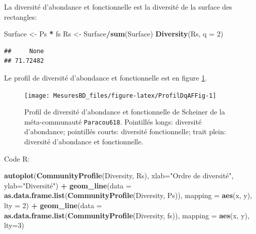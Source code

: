 \documentclass[
  11pt,
  french,
  a4paper,
  extrafontsizes,onecolumn,openright
  ]{memoir}
\newenvironment{Shaded}{\begin{snugshade}}{\end{snugshade}}
\newcommand{\DataTypeTok}[1]{\textcolor[rgb]{0.13,0.29,0.53}{#1}}
\newcommand{\DecValTok}[1]{\textcolor[rgb]{0.00,0.00,0.81}{#1}}
\newcommand{\KeywordTok}[1]{\textcolor[rgb]{0.13,0.29,0.53}{\textbf{#1}}}
\newcommand{\NormalTok}[1]{#1}
\newcommand{\OperatorTok}[1]{\textcolor[rgb]{0.81,0.36,0.00}{\textbf{#1}}}
\newcommand{\StringTok}[1]{\textcolor[rgb]{0.31,0.60,0.02}{#1}}
\begin{document}
\normalsize

La diversité d'abondance et fonctionnelle est la diversité de la surface des rectangles:

\scriptsize

\begin{Shaded}
\begin{Highlighting}[]
\NormalTok{Surface <-}\StringTok{ }\NormalTok{Ps }\OperatorTok{*}\StringTok{ }\NormalTok{fs}
\NormalTok{Rs <-}\StringTok{ }\NormalTok{Surface}\OperatorTok{/}\KeywordTok{sum}\NormalTok{(Surface)}
\KeywordTok{Diversity}\NormalTok{(Rs, }\DataTypeTok{q =} \DecValTok{2}\NormalTok{)}
\end{Highlighting}
\end{Shaded}

\begin{verbatim}
##     None 
## 71.72482
\end{verbatim}

\normalsize

Le profil de diversité d'abondance et fonctionnelle est en figure \ref{fig:ProfilDqAFFig}.



\scriptsize

\begin{figure}

{\centering \texttt{[image: MesuresBD\_files/figure-latex/ProfilDqAFFig-1]} 

}

\caption{Profil de diversité d'abondance et fonctionnelle de Scheiner de la méta-communauté \texttt{Paracou618}. Pointillés longs: diversité d'abondance; pointillés courts: diversité fonctionnelle; trait plein: diversité d'abondance et fonctionnelle.}\label{fig:ProfilDqAFFig}
\end{figure}

\normalsize

Code R:

\scriptsize

\begin{Shaded}
\begin{Highlighting}[]
\KeywordTok{autoplot}\NormalTok{(}\KeywordTok{CommunityProfile}\NormalTok{(Diversity, Rs), }
         \DataTypeTok{xlab=}\StringTok{"Ordre de diversité"}\NormalTok{, }\DataTypeTok{ylab=}\StringTok{"Diversité"}\NormalTok{) }\OperatorTok{+}
\KeywordTok{geom_line}\NormalTok{(}\DataTypeTok{data =} \KeywordTok{as.data.frame.list}\NormalTok{(}\KeywordTok{CommunityProfile}\NormalTok{(Diversity, Ps)), }
          \DataTypeTok{mapping =} \KeywordTok{aes}\NormalTok{(x, y), }\DataTypeTok{lty =} \DecValTok{2}\NormalTok{) }\OperatorTok{+}
\KeywordTok{geom_line}\NormalTok{(}\DataTypeTok{data =} \KeywordTok{as.data.frame.list}\NormalTok{(}\KeywordTok{CommunityProfile}\NormalTok{(Diversity, fs)),}
          \DataTypeTok{mapping =} \KeywordTok{aes}\NormalTok{(x, y), }\DataTypeTok{lty=}\DecValTok{3}\NormalTok{)}
\end{Highlighting}
\end{Shaded}
\end{document}

